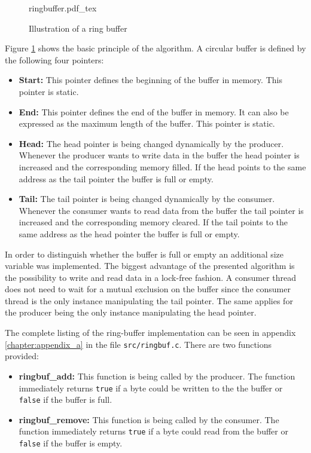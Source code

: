\begin{figure}[H]
\centering
{ringbuffer.pdf_tex}
\caption{Illustration of a ring buffer}
\label{fig:ringbuffer}
\end{figure}

Figure \ref{fig:ringbuffer} shows the basic principle of the algorithm. A circular buffer is defined by the following four pointers:

\begin{itemize}
\item \textbf{Start:} This pointer defines the beginning of the buffer in memory. This pointer is static.
\item \textbf{End:} This pointer defines the end of the buffer in memory. It can also be expressed as the maximum length of the buffer. This pointer is static.
\item \textbf{Head:} The head pointer is being changed dynamically by the producer. Whenever the producer wants to write data in the buffer the head pointer is increased and the corresponding memory filled. If the head points to the same address as the tail pointer the buffer is full or empty.
\item \textbf{Tail:} The tail pointer is being changed dynamically by the consumer. Whenever the consumer wants to read data from the buffer the tail pointer is increased and the corresponding memory cleared. If the tail points to the same address as the head pointer the buffer is full or empty.
\end{itemize}

In order to distinguish whether the buffer is full or empty an additional size variable was implemented. The biggest advantage of the presented algorithm is the possibility to write and read data in a lock-free fashion. A consumer thread does not need to wait for a mutual exclusion on the buffer since the consumer thread is the only instance manipulating the tail pointer. The same applies for the producer being the only instance manipulating the head pointer.

The complete listing of the ring-buffer implementation can be seen in appendix \ref{chapter:appendix_a} in the file \texttt{src/ringbuf.c}. There are two functions provided:

\begin{itemize}
\item \textbf{ringbuf\_add:} This function is being called by the producer. The function immediately returns \texttt{true} if a byte could be written to the the buffer or \texttt{false} if the buffer is full.
\item \textbf{ringbuf\_remove:} This function is being called by the consumer. The function immediately returns \texttt{true} if a byte could read from the buffer or \texttt{false} if the buffer is empty.
\end{itemize}

